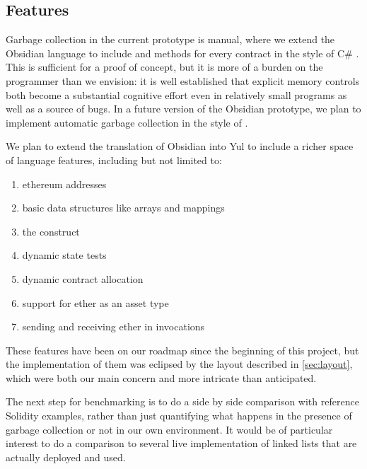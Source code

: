 
\subsection{Features}

Garbage collection in the current prototype is manual, where we extend the
Obsidian language to include  and  methods
for every contract in the style of C\# \cite{TODO}. This is sufficient for
a proof of concept, but it is more of a burden on the programmer than we
envision: it is well established that explicit memory controls both become
a substantial cognitive effort even in relatively small programs as well as
a source of bugs. \cite{TODO} In a future version of the Obsidian
prototype, we plan to implement automatic garbage collection in the style
of \todo{}. \cite{TODO}

We plan to extend the translation of Obsidian into Yul to include a richer
space of language features, including but not limited to:
\begin{enumerate} %
\item ethereum addresses
\item basic data structures like arrays and mappings
\item the  construct
\item dynamic state tests
\item dynamic contract allocation
\item support for ether as an asset type
\item sending and receiving ether in invocations
\end{enumerate}
These features have been on our roadmap since the beginning of this
project, but the implementation of them was eclipsed by the layout
described in \ref{sec:layout}, which were both our main concern and more
intricate than anticipated.

The next step for benchmarking is to do a side by side comparison with
reference Solidity examples, rather than just quantifying what happens in
the presence of garbage collection or not in our own environment. It would
be of particular interest to do a comparison to several live implementation
of linked lists that are actually deployed and used.

